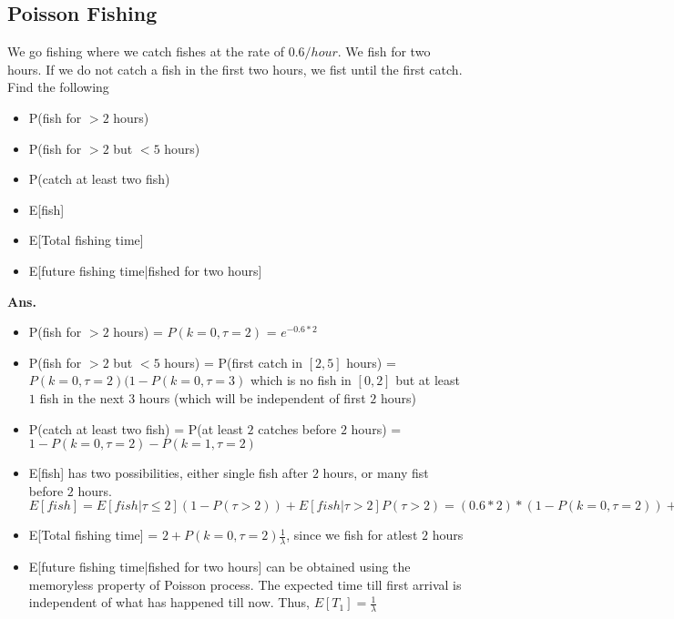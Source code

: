 \documentclass[11pt, a4paper]{article}
\begin{document}
    \subsection{Poisson Fishing}
    We go fishing where we catch fishes at the rate of $0.6/hour$. We fish for two hours. If we do not catch a fish in the first two hours, we fist until the first catch. Find the following
    \begin{itemize}
        \item P(fish for $> 2$ hours)
        \item P(fish for $> 2$ but $< 5$ hours)
        \item P(catch at least two fish)
        \item E[fish]
        \item E[Total fishing time]
        \item E[future fishing time|fished for two hours]
    \end{itemize}
    \textbf{Ans.}
    \begin{itemize}
        \item P(fish for $> 2$ hours) = $P(k=0, \tau=2)$ = $e^{-0.6 * 2}$
        \item P(fish for $> 2$ but $< 5$ hours) = P(first catch in $[2,5]$ hours) = $P(k=0,\tau=2)(1-P(k=0,\tau=3)$ which is no fish in $[0,2]$ but at least $1$ fish in the next $3$ hours (which will be independent of first $2$ hours)
        \item P(catch at least two fish) = P(at least $2$ catches before $2$ hours) = $1 - P(k=0,\tau=2) - P(k=1,\tau=2)$
        \item E[fish] has two possibilities, either single fish after $2$ hours, or many fist before $2$ hours. $E[fish] = E[fish|\tau \leq 2](1-P(\tau > 2)) + E[fish|\tau > 2] P(\tau > 2) = (0.6*2)*(1-P(k=0,\tau=2)) + 1*P(k=0,\tau=2)$
        \item E[Total fishing time] = $2 + P(k=0,\tau=2)\frac{1}{\lambda}$, since we fish for atlest $2$ hours
        \item E[future fishing time|fished for two hours] can be obtained using the memoryless property of Poisson process. The expected time till first arrival is independent of what has happened till now. Thus, $E[T_{1}] = \frac{1}{\lambda}$
    \end{itemize}


\end{document}
